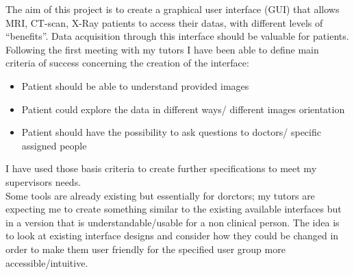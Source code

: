 The aim of this project is to create a graphical user interface (GUI) that allows MRI, CT-scan, X-Ray patients to access their datas, with different levels of “benefits”. Data acquisition through this interface should be valuable for patients. \\
Following the first meeting with my tutors I have been able to define main criteria of success concerning the creation of the interface:
\begin{itemize}
\item Patient should be able to understand provided images 
\item Patient could explore the data in different ways/ different images orientation
\item Patient should have the possibility to ask questions to doctors/ specific assigned people
\end{itemize}
I have used those basis criteria to create further specifications to meet my supervisors needs.\\

Some tools are already existing but essentially for dorctors; my tutors are expecting me to create something similar to the existing available interfaces but in a version that is understandable/usable for a non clinical person. The idea is to look at existing interface designs and consider how they could be changed in order to make them user friendly for the specified user group more accessible/intuitive.
